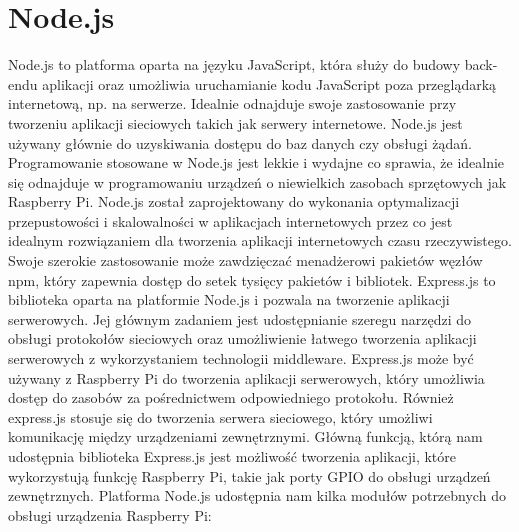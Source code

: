 \section{Node.js}
Node.js to platforma oparta na języku JavaScript, która służy do budowy back-endu aplikacji oraz umożliwia uruchamianie kodu JavaScript poza przeglądarką internetową, np. na serwerze. Idealnie odnajduje swoje zastosowanie przy tworzeniu aplikacji sieciowych takich jak serwery internetowe. Node.js jest używany głównie do uzyskiwania dostępu do baz danych czy obsługi żądań. Programowanie stosowane w Node.js jest lekkie i wydajne co sprawia, że idealnie się odnajduje w programowaniu urządzeń o niewielkich zasobach sprzętowych jak Raspberry Pi. Node.js został zaprojektowany do wykonania optymalizacji przepustowości i skalowalności w aplikacjach internetowych przez co jest idealnym rozwiązaniem dla tworzenia aplikacji internetowych czasu rzeczywistego. Swoje szerokie zastosowanie może zawdzięczać menadżerowi pakietów węzłów npm, który zapewnia dostęp do setek tysięcy pakietów i bibliotek. Express.js to biblioteka oparta na platformie Node.js i pozwala na tworzenie aplikacji serwerowych. Jej głównym zadaniem jest udostępnianie szeregu narzędzi do obsługi protokołów sieciowych oraz umożliwienie łatwego tworzenia aplikacji serwerowych z wykorzystaniem technologii middleware. Express.js może być używany z Raspberry Pi do tworzenia aplikacji serwerowych, który umożliwia dostęp do zasobów za pośrednictwem odpowiedniego protokołu. Również express.js stosuje się do tworzenia serwera sieciowego, który umożliwi komunikację między urządzeniami zewnętrznymi. Główną funkcją, którą nam udostępnia biblioteka Express.js jest możliwość tworzenia aplikacji, które wykorzystują funkcję Raspberry Pi, takie jak porty GPIO do obsługi urządzeń zewnętrznych. Platforma Node.js udostępnia nam kilka modułów potrzebnych do obsługi urządzenia Raspberry Pi:
